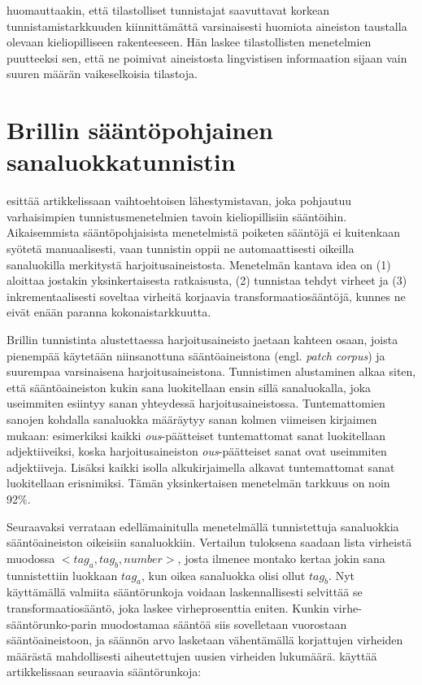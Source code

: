 \documentclass[utf8,bachelor,manualbib]{gradu3}
\begin{document}
\citet{brill1992} huomauttaakin, että tilastolliset tunnistajat saavuttavat korkean tunnistamistarkkuuden kiinnittämättä varsinaisesti huomiota aineiston taustalla olevaan kieliopilliseen rakenteeseen. Hän laskee tilastollisten menetelmien puutteeksi sen, että ne poimivat aineistosta lingvistisen informaation sijaan vain suuren määrän vaikeselkoisia tilastoja.

\section{Brillin sääntöpohjainen sanaluokkatunnistin}

\citet{brill1992} esittää artikkelissaan vaihtoehtoisen lähestymistavan, joka pohjautuu varhaisimpien tunnistusmenetelmien tavoin kieliopillisiin sääntöihin. Aikaisemmista sääntöpohjaisista menetelmistä poiketen sääntöjä ei kuitenkaan syötetä manuaalisesti, vaan tunnistin oppii ne automaattisesti oikeilla sanaluokilla merkitystä harjoitusaineistosta. Menetelmän kantava idea on (1) aloittaa jostakin yksinkertaisesta ratkaisusta, (2) tunnistaa tehdyt virheet ja (3) inkrementaalisesti soveltaa virheitä korjaavia transformaatiosääntöjä, kunnes ne eivät enään paranna kokonaistarkkuutta.

Brillin tunnistinta alustettaessa harjoitusaineisto jaetaan kahteen osaan, joista pienempää käytetään niinsanottuna sääntöaineistona (engl. \textit{patch corpus}) ja suurempaa varsinaisena harjoitusaineistona. Tunnistimen alustaminen alkaa siten, että sääntöaineiston kukin sana luokitellaan ensin sillä sanaluokalla, joka useimmiten esiintyy sanan yhteydessä harjoitusaineistossa. Tuntemattomien sanojen kohdalla sanaluokka määräytyy sanan kolmen viimeisen kirjaimen mukaan: esimerkiksi kaikki \textit{ous}-päätteiset tuntemattomat sanat luokitellaan adjektiiveiksi, koska harjoitusaineiston \textit{ous}-päätteiset sanat ovat useimmiten adjektiiveja. Lisäksi kaikki isolla alkukirjaimella alkavat tuntemattomat sanat luokitellaan erisnimiksi. Tämän yksinkertaisen menetelmän tarkkuus on noin 92\%. \citep{brill1992}

Seuraavaksi verrataan edellämainitulla menetelmällä tunnistettuja sanaluokkia sääntöaineiston oikeisiin sanaluokkiin. Vertailun tuloksena saadaan lista virheistä muodossa $<tag_a, tag_b, number>$, josta ilmenee montako kertaa jokin sana tunnistettiin luokkaan $tag_a$, kun oikea sanaluokka olisi ollut $tag_b$. Nyt käyttämällä valmiita sääntörunkoja voidaan laskennallisesti selvittää se transformaatiosääntö, joka laskee virheprosenttia eniten. Kunkin virhe-sääntörunko-parin muodostamaa sääntöä siis sovelletaan vuorostaan sääntöaineistoon, ja säännön arvo lasketaan vähentämällä korjattujen virheiden määrästä mahdollisesti aiheutettujen uusien virheiden lukumäärä. \citet{brill1992} käyttää artikkelissaan seuraavia sääntörunkoja:
\end{document}
